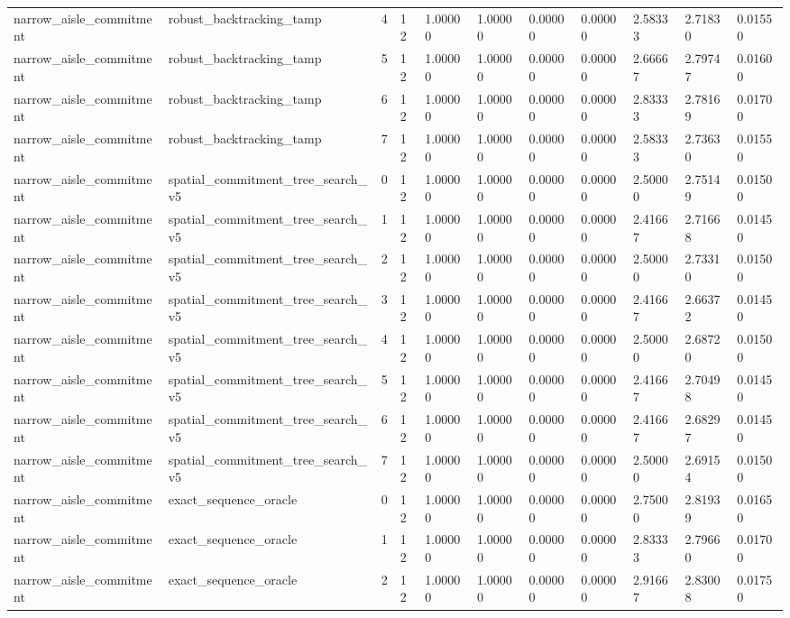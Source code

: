 \documentclass{article}
\begin{document}
\begin{table}[tbp]
{\begin{tabular}{lllllllllll}
narrow\_aisle\_commitment & robust\_backtracking\_tamp & 4 & 12 & 1.00000 & 1.00000 & 0.00000 & 0.00000 & 2.58333 & 2.71830 & 0.01550 \\
narrow\_aisle\_commitment & robust\_backtracking\_tamp & 5 & 12 & 1.00000 & 1.00000 & 0.00000 & 0.00000 & 2.66667 & 2.79747 & 0.01600 \\
narrow\_aisle\_commitment & robust\_backtracking\_tamp & 6 & 12 & 1.00000 & 1.00000 & 0.00000 & 0.00000 & 2.83333 & 2.78169 & 0.01700 \\
narrow\_aisle\_commitment & robust\_backtracking\_tamp & 7 & 12 & 1.00000 & 1.00000 & 0.00000 & 0.00000 & 2.58333 & 2.73630 & 0.01550 \\
narrow\_aisle\_commitment & spatial\_commitment\_tree\_search\_v5 & 0 & 12 & 1.00000 & 1.00000 & 0.00000 & 0.00000 & 2.50000 & 2.75149 & 0.01500 \\
narrow\_aisle\_commitment & spatial\_commitment\_tree\_search\_v5 & 1 & 12 & 1.00000 & 1.00000 & 0.00000 & 0.00000 & 2.41667 & 2.71668 & 0.01450 \\
narrow\_aisle\_commitment & spatial\_commitment\_tree\_search\_v5 & 2 & 12 & 1.00000 & 1.00000 & 0.00000 & 0.00000 & 2.50000 & 2.73310 & 0.01500 \\
narrow\_aisle\_commitment & spatial\_commitment\_tree\_search\_v5 & 3 & 12 & 1.00000 & 1.00000 & 0.00000 & 0.00000 & 2.41667 & 2.66372 & 0.01450 \\
narrow\_aisle\_commitment & spatial\_commitment\_tree\_search\_v5 & 4 & 12 & 1.00000 & 1.00000 & 0.00000 & 0.00000 & 2.50000 & 2.68720 & 0.01500 \\
narrow\_aisle\_commitment & spatial\_commitment\_tree\_search\_v5 & 5 & 12 & 1.00000 & 1.00000 & 0.00000 & 0.00000 & 2.41667 & 2.70498 & 0.01450 \\
narrow\_aisle\_commitment & spatial\_commitment\_tree\_search\_v5 & 6 & 12 & 1.00000 & 1.00000 & 0.00000 & 0.00000 & 2.41667 & 2.68297 & 0.01450 \\
narrow\_aisle\_commitment & spatial\_commitment\_tree\_search\_v5 & 7 & 12 & 1.00000 & 1.00000 & 0.00000 & 0.00000 & 2.50000 & 2.69154 & 0.01500 \\
narrow\_aisle\_commitment & exact\_sequence\_oracle & 0 & 12 & 1.00000 & 1.00000 & 0.00000 & 0.00000 & 2.75000 & 2.81939 & 0.01650 \\
narrow\_aisle\_commitment & exact\_sequence\_oracle & 1 & 12 & 1.00000 & 1.00000 & 0.00000 & 0.00000 & 2.83333 & 2.79660 & 0.01700 \\
narrow\_aisle\_commitment & exact\_sequence\_oracle & 2 & 12 & 1.00000 & 1.00000 & 0.00000 & 0.00000 & 2.91667 & 2.83008 & 0.01750 \\

\end{tabular}}
\end{table}
\end{document}

